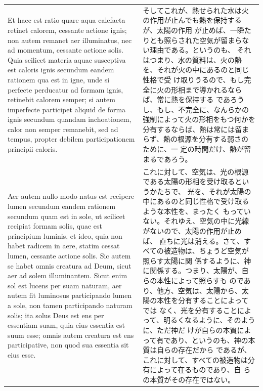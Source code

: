\documentclass[paper=a4paper,fontsize=10pt,jafontsize=9pt,titlepage]{jlreq}
\begin{document}
\begin{longtable}{p{21em}p{21em}}
\\



Et haec est ratio quare aqua
calefacta retinet calorem, cessante actione ignis; non autem remanet aer
illuminatus, nec ad momentum, cessante actione solis. Quia scilicet
materia aquae susceptiva est caloris ignis secundum eandem rationem qua
est in igne, unde si perfecte perducatur ad formam ignis, retinebit
calorem semper; si autem imperfecte participet aliquid de forma ignis
secundum quandam inchoationem, calor non semper remanebit, sed ad
tempus, propter debilem participationem principii caloris. 


&


そしてこれが、熱せられた水は火の作用が止んでも熱を保持するが、太陽の作用
 が止めば、一瞬たりとも照らされた空気が留まらない理由である。というのも、
 それはつまり、水の質料は、火の熱を、それが火の中にあるのと同じ性格で受
 け取りうるので、もし完全に火の形相まで導かれるならば、常に熱を保持する
 であろうし、もし、不完全に、なんらかの強制によって火の形相をもつ何かを
 分有するならば、熱は常には留まらず、熱の根源を分有する弱さのために、一
 定の時間だけ、熱が留まるであろう。

\\



Aer autem
nullo modo natus est recipere lumen secundum eandem rationem secundum
quam est in sole, ut scilicet recipiat formam solis, quae est principium
luminis, et ideo, quia non habet radicem in aere, statim cessat lumen,
cessante actione solis. Sic autem se habet omnis creatura ad Deum, sicut
aer ad solem illuminantem. Sicut enim sol est lucens per suam naturam,
aer autem fit luminosus participando lumen a sole, non tamen
participando naturam solis; ita solus Deus est ens per essentiam suam,
quia eius essentia est suum esse; omnis autem creatura est ens
participative, non quod sua essentia sit eius esse. 


&
これに対して、空気は、光の根源である太陽の形相を受け取るというかたちで、
 光を、それが太陽の中にあるのと同じ性格で受け取るような本性を、まったく
 もっていない。それゆえ、空気の中に光線がないので、太陽の作用が止めば、
 直ちに光は消える。さて、すべての被造物は、ちょうど空気が照らす太陽に関
 係するように、神に関係する。つまり、太陽が、自らの本性によって照らすも
 のであり、他方、空気は、太陽から、太陽の本性を分有することによってでは
 なく、光を分有することによって、明るくなるように、そのように、ただ神だ
 けが自らの本質によって有であり、というのも、神の本質は自らの存在だから
 であるが、これに対して、すべての被造物は分有によって在るものであり、自
 らの本質がその存在ではない。


\end{longtable}
\end{document}
